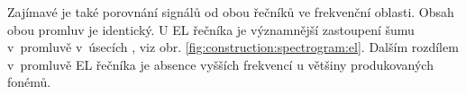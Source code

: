 
Zajímavé je také porovnání signálů od obou řečníků ve frekvenční oblasti.
Obsah obou promluv je identický.
U EL řečníka je významnější zastoupení šumu v~promluvě
v~úsecích , viz obr. \ref{fig:construction:spectrogram:el}.
Dalším rozdílem v~promluvě EL řečníka je absence vyšších frekvencí u většiny produkovaných fonémů.

